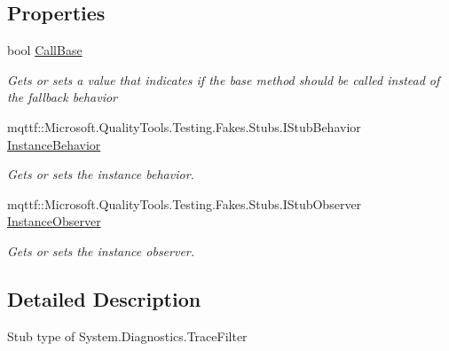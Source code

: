 \subsection*{Properties}
\begin{DoxyCompactItemize}
\item 
bool \hyperlink{class_system_1_1_diagnostics_1_1_fakes_1_1_stub_trace_filter_a7873c384403acec63d7bfc6205cce3ab}{Call\-Base}
\begin{DoxyCompactList}\small\item\em Gets or sets a value that indicates if the base method should be called instead of the fallback behavior\end{DoxyCompactList}\item 
mqttf\-::\-Microsoft.\-Quality\-Tools.\-Testing.\-Fakes.\-Stubs.\-I\-Stub\-Behavior \hyperlink{class_system_1_1_diagnostics_1_1_fakes_1_1_stub_trace_filter_a0d4e3d8d7d76b4cba6f5fcb1ef5dc867}{Instance\-Behavior}
\begin{DoxyCompactList}\small\item\em Gets or sets the instance behavior.\end{DoxyCompactList}\item 
mqttf\-::\-Microsoft.\-Quality\-Tools.\-Testing.\-Fakes.\-Stubs.\-I\-Stub\-Observer \hyperlink{class_system_1_1_diagnostics_1_1_fakes_1_1_stub_trace_filter_a4bb6f09ab2b2f28d292cf19f90c31c90}{Instance\-Observer}
\begin{DoxyCompactList}\small\item\em Gets or sets the instance observer.\end{DoxyCompactList}\end{DoxyCompactItemize}


\subsection{Detailed Description}
Stub type of System.\-Diagnostics.\-Trace\-Filter



